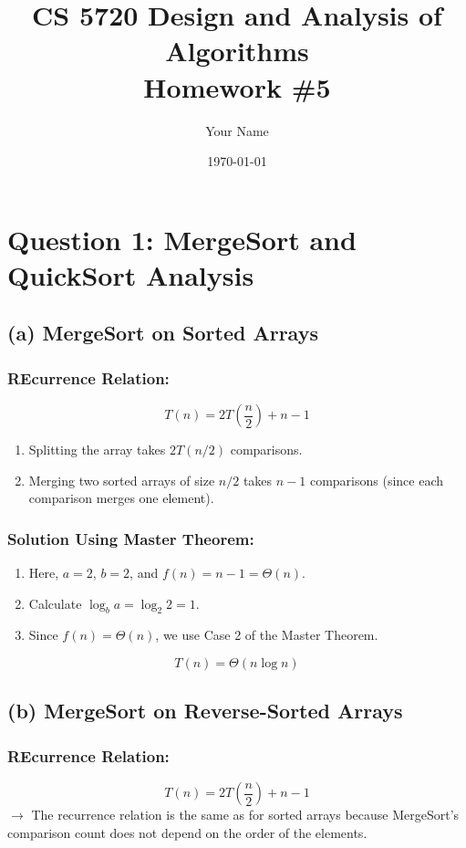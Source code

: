 \documentclass{article}
\title{CS 5720 Design and Analysis of Algorithms \\ Homework \#5}
\author{Your Name}
\date{\today}
\begin{document}
\maketitle

\section*{Question 1: MergeSort and QuickSort Analysis}
\subsection*{(a) MergeSort on Sorted Arrays}
\subsubsection*{REcurrence Relation: }
      \[
      T(n) = 2T\left(\frac{n}{2}\right) + n - 1
      \]
   \begin{enumerate}
      \item Splitting the array takes $2T(n/2)$ comparisons.
      \item Merging two sorted arrays of size $n/2$ takes $n - 1$ comparisons (since each comparison merges one element).
   \end{enumerate}
\subsubsection*{Solution Using Master Theorem: }
   \begin{enumerate}
      \item Here, $a = 2$, $b = 2$, and $f(n) = n - 1 = \Theta(n)$.
      \item Calculate $\log_b{a} = \log_2{2} = 1$.
      \item Since $f(n) = \Theta(n)$, we use Case 2 of the Master Theorem.
   \end{enumerate}
   \[
   T(n) = \Theta(n \log n)
   \]

\subsection*{(b) MergeSort on Reverse-Sorted Arrays}
\subsubsection*{REcurrence Relation: }
   \[
   T(n) = 2T\left(\frac{n}{2}\right) + n - 1
   \]
   $\longrightarrow$ The recurrence relation is the same as for sorted arrays because MergeSort's comparison count does not depend on the order of the elements.
\end{document}
